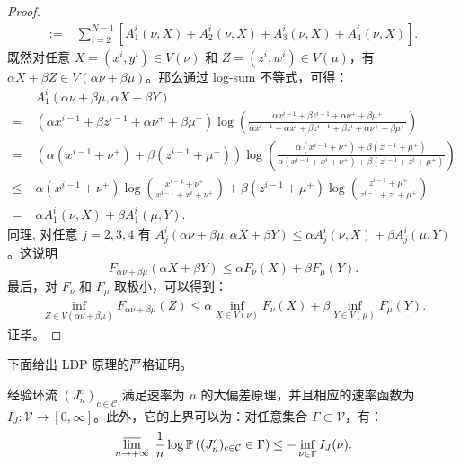 \begin{proof}
\begin{align*}
		:=&\;\sum_{i=2}^{N-1}[A_1^i(\nu,X)+A_2^i(\nu,X)+A_3^i(\nu,X)+A_4^i(\nu,X)].
	\end{align*}
	既然对任意 $X=(x^i,y^i)\in V(\nu)$ 和 $Z=(z^i,w^i)\in V(\mu)$，有 $\alpha X+\beta Z\in V(\alpha\nu+\beta\mu)$。那么通过 log-sum 不等式，可得：
	\begin{align*}
		&\;A_1^i(\alpha\nu+\beta \mu,\alpha X+\beta Y)\\
		=&\;(\alpha x^{i-1}+\beta z^{i-1}+\alpha\nu^++\beta \mu^+ )\log\left(\frac{\alpha x^{i-1}+\beta z^{i-1}+\alpha\nu^++\beta \mu^+}{\alpha x^{i-1}+\alpha x^i+\beta z^{i-1}+\beta z^i+\alpha\nu^++\beta \mu^+}\right)\\
		=&\;(\alpha (x^{i-1}+\nu^+)+\beta (z^{i-1}+ \mu^+) )\log\left(\frac{\alpha (x^{i-1}+\nu^+)+\beta (z^{i-1}+ \mu^+)}{\alpha (x^{i-1}+ x^i+\nu^+)+\beta (z^{i-1}+ z^i+ \mu^+)}\right)\\
		\le &\; \alpha (x^{i-1}+\nu^+)\log\left(\frac{x^{i-1}+\nu^+}{x^{i-1}+ x^i+\nu^+}\right)+\beta (z^{i-1}+ \mu^+)\log\left(\frac{z^{i-1}+ \mu^+}{z^{i-1}+ z^i+ \mu^+}\right)\\
		=&\;\alpha A^i_1(\nu,X)+\beta A^i_1(\mu,Y).
	\end{align*}
	同理, 对任意 $j=2,3,4$ 有 $A^i_j(\alpha \nu+\beta \mu,\alpha X+\beta Y)\le \alpha A^i_j(\nu,X)+\beta A^i_j (\mu,Y)$。这说明
	\begin{equation*}
		F_{\alpha \nu+\beta \mu}(\alpha X+\beta Y)\le \alpha F_{\nu}(X)+\beta F_{\mu}(Y).
	\end{equation*}
	最后，对 $F_{\nu}$ 和 $F_{\mu}$ 取极小，可以得到：
	\begin{align*}
		\inf_{Z\in V(\alpha\nu+\beta\mu)}F_{\alpha\nu+\beta\mu}( Z)\le\alpha \inf_{X\in V(\nu)} F_{\nu}(X)+\beta \inf_{Y\in V(\mu)} F_{\mu}(Y).
	\end{align*}
	证毕。
\end{proof}
下面给出 LDP 原理的严格证明。
\\
\begin{proposition} \label{theorem:LDP}
	经验环流 $(J^c_n)_{c\in\mathcal{C}}$ 满足速率为 $n$ 的大偏差原理，并且相应的速率函数为 $I_J:\mathcal{V}\to [0,\infty]$。此外，它的上界可以为：对任意集合 $\Gamma \subset \mathcal{V}$，有：
	\begin{align}\label{upper bound}
		\varlimsup_{n\to+\infty}\;
		\frac 1n \log \mathbb  P \left( (J^c_n)_{c\in \mathcal{C}} \in \Gamma \right)
		\le -\inf_{\nu\in \Gamma} I_J(\nu).
	\end{align}
\end{proposition}
